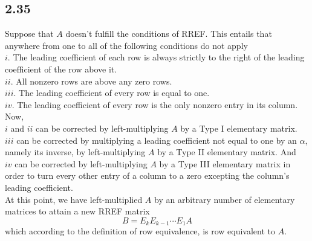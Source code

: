 \documentclass[letterpaper,12pt]{article}
\theoremstyle{definition}
\begin{document}
\subsection*{2.35}
Suppose that $A$ doesn't fulfill the conditions of RREF. This entails that anywhere from one to all of the following conditions do not apply
\\$i$. The leading coefficient of each row is always strictly to the right of the leading coefficient of the row above it.
\\$ii$. All nonzero rows are above any zero rows.
\\$iii$. The leading coefficient of every row is equal to one.
\\$iv$. The leading coefficient of every row is the only nonzero entry in its column. 
Now, \\$i$ and $ii$ can be corrected by left-multiplying $A$ by a Type I elementary matrix. \\$iii$ can be corrected by multiplying a leading coefficient not equal to one by an $\alpha$, namely its inverse, by left-multiplying $A$ by a Type II elementary matrix. And \\$iv$ can be corrected by left-multiplying $A$ by a Type III elementary matrix in order to turn every other entry of a column to a zero excepting the column's leading coefficient.
\\At this point, we have left-multiplied $A$ by an arbitrary number of elementary matrices to attain a new RREF matrix \[B = E_kE_{k-1}\cdots E_1A\]which according to the definition of row equivalence, is row equivalent to $A$. 
\end{document}
